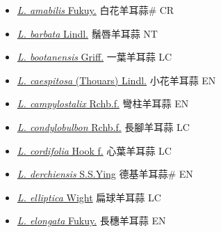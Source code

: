 \begin{itemize}
  \begin{itemize}
        \item[] \href{http://www.theplantlist.org/tpl1.1/search?q=Liparis+amabilis}{\textit{L. amabilis} Fukuy.}   白花羊耳蒜\# CR
        \item[] \href{http://www.theplantlist.org/tpl1.1/search?q=Liparis+barbata}{\textit{L. barbata} Lindl.}   鬚唇羊耳蒜 NT
        \item[] \href{http://www.theplantlist.org/tpl1.1/search?q=Liparis+bootanensis}{\textit{L. bootanensis} Griff.}   一葉羊耳蒜 LC
        \item[] \href{http://www.theplantlist.org/tpl1.1/search?q=Liparis+caespitosa}{\textit{L. caespitosa} (Thouars) Lindl.}   小花羊耳蒜 EN
        \item[] \href{http://www.theplantlist.org/tpl1.1/search?q=Liparis+campylostalix}{\textit{L. campylostalix} Rchb.f.}   彎柱羊耳蒜 EN
        \item[] \href{http://www.theplantlist.org/tpl1.1/search?q=Liparis+condylobulbon}{\textit{L. condylobulbon} Rchb.f.}   長腳羊耳蒜 LC
        \item[] \href{http://www.theplantlist.org/tpl1.1/search?q=Liparis+cordifolia}{\textit{L. cordifolia} Hook f.}   心葉羊耳蒜 LC
        \item[] \href{http://www.theplantlist.org/tpl1.1/search?q=Liparis+derchiensis}{\textit{L. derchiensis} S.S.Ying}   德基羊耳蒜\# EN
        \item[] \href{http://www.theplantlist.org/tpl1.1/search?q=Liparis+elliptica}{\textit{L. elliptica} Wight}   扁球羊耳蒜 LC
        \item[] \href{http://www.theplantlist.org/tpl1.1/search?q=Liparis+elongata}{\textit{L. elongata} Fukuy.}     長穗羊耳蒜 EN

\end{itemize}
\end{itemize}
